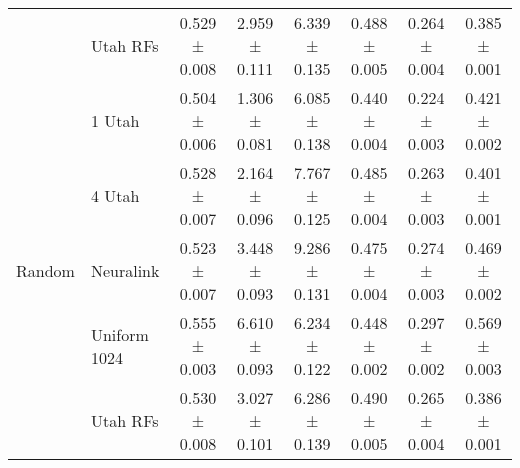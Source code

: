 \begin{table}
\begin{tabular}{llcccccc}
 & Utah RFs & 0.529 ± 0.008 & 2.959 ± 0.111 & 6.339 ± 0.135 & 0.488 ± 0.005 & 0.264 ± 0.004 & 0.385 ± 0.001 \\
\cline{1-8}
\multirow[t]{5}{*}{Random} & 1 Utah & 0.504 ± 0.006 & 1.306 ± 0.081 & 6.085 ± 0.138 & 0.440 ± 0.004 & 0.224 ± 0.003 & 0.421 ± 0.002 \\
 & 4 Utah & 0.528 ± 0.007 & 2.164 ± 0.096 & 7.767 ± 0.125 & 0.485 ± 0.004 & 0.263 ± 0.003 & 0.401 ± 0.001 \\
 & Neuralink & 0.523 ± 0.007 & 3.448 ± 0.093 & 9.286 ± 0.131 & 0.475 ± 0.004 & 0.274 ± 0.003 & 0.469 ± 0.002 \\
 & Uniform 1024 & 0.555 ± 0.003 & 6.610 ± 0.093 & 6.234 ± 0.122 & 0.448 ± 0.002 & 0.297 ± 0.002 & 0.569 ± 0.003 \\
 & Utah RFs & 0.530 ± 0.008 & 3.027 ± 0.101 & 6.286 ± 0.139 & 0.490 ± 0.005 & 0.265 ± 0.004 & 0.386 ± 0.001 \\
\cline{1-8}
\bottomrule
\end{tabular}
\end{table}
